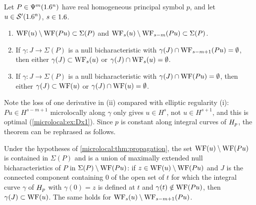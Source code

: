 \begin{theorem}\label{microlocal:thm:propagation}
  Let $P\in\Psi^{m}(1.6^n)$ have real homogeneous principal symbol $p$, and let
  $u\in\mathcal{S}'(1.6^n)$, $s\in1.6$.
  \begin{enumerate}[label=\textup{(\roman*)}]
  \item $\operatorname{WF}(u)\setminus\operatorname{WF}(Pu)\subset\Sigma(P)$ and
    $\operatorname{WF}_s(u)\setminus\operatorname{WF}_{s-m}(Pu)\subset\Sigma(P)$.
  \item If $\gamma:J\to\Sigma(P)$ is a null bicharacteristic with
    $\gamma(J)\cap\operatorname{WF}_{s-m+1}(Pu)=\emptyset$, then either
    $\gamma(J)\subset\operatorname{WF}_s(u)$ or $\gamma(J)\cap\operatorname{WF}_s(u)=\emptyset$.
  \item If $\gamma:J\to\Sigma(P)$ is a null bicharacteristic with
    $\gamma(J)\cap\operatorname{WF}(Pu)=\emptyset$, then either $\gamma(J)\subset\operatorname{WF}(u)$ or
    $\gamma(J)\cap\operatorname{WF}(u)=\emptyset$.
  \end{enumerate}
\end{theorem}

Note the loss of one derivative in (ii) compared with elliptic regularity
(i): $Pu\in H^{s-m+1}$ microlocally along $\gamma$ only gives $u\in H^s$, not
$u\in H^{s+1}$, and this is optimal (\cref{microlocal:ex:Dx1}). Since $p$ is
constant along integral curves of $H_{p}$, the theorem can be rephrased as
follows.

\begin{corollary}\label{microlocal:cor:propagation}
  Under the hypotheses of \cref{microlocal:thm:propagation}, the set
  $\operatorname{WF}(u)\setminus\operatorname{WF}(Pu)$ is contained in $\Sigma(P)$ and is a union of
  maximally extended null bicharacteristics of $P$ in
  $\Sigma(P)\setminus\operatorname{WF}(Pu)$: if $z\in\operatorname{WF}(u)\setminus\operatorname{WF}(Pu)$ and $J$ is the
  connected component containing $0$ of the open set of $t$ for which the
  integral curve $\gamma$ of $H_{p}$ with $\gamma(0)=z$ is defined at $t$ and
  $\gamma(t)\notin\operatorname{WF}(Pu)$, then $\gamma(J)\subset\operatorname{WF}(u)$. The same holds for
  $\operatorname{WF}_s(u)\setminus\operatorname{WF}_{s-m+1}(Pu)$.
\end{corollary}


